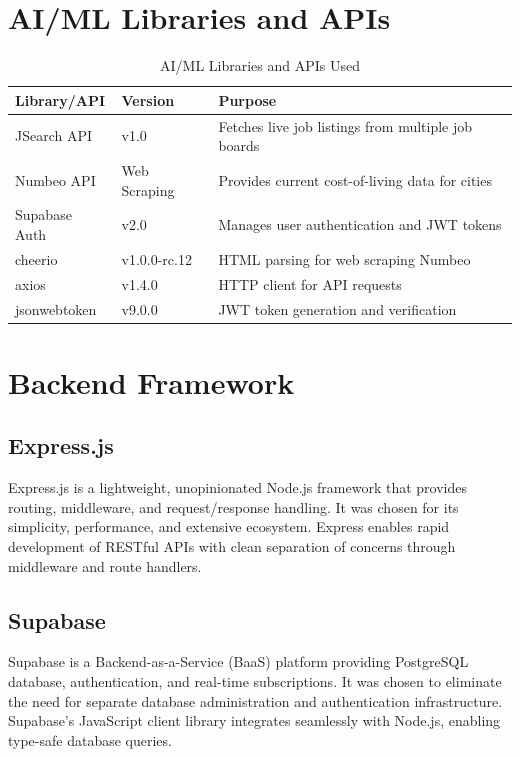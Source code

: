 \documentclass[12pt,a4paper,oneside]{report}
\begin{document}
\section{AI/ML Libraries and APIs}

\begin{table}[H]
\centering
\caption{AI/ML Libraries and APIs Used}
\label{tab:libraries}
\begin{tabular}{|l|l|p{5cm}|}
\hline
\textbf{Library/API} & \textbf{Version} & \textbf{Purpose} \\
\hline
JSearch API & v1.0 & Fetches live job listings from multiple job boards \\
\hline
Numbeo API & Web Scraping & Provides current cost-of-living data for cities \\
\hline
Supabase Auth & v2.0 & Manages user authentication and JWT tokens \\
\hline
cheerio & v1.0.0-rc.12 & HTML parsing for web scraping Numbeo \\
\hline
axios & v1.4.0 & HTTP client for API requests \\
\hline
jsonwebtoken & v9.0.0 & JWT token generation and verification \\
\hline
\end{tabular}
\end{table}

\section{Backend Framework}

\subsection{Express.js}

Express.js is a lightweight, unopinionated Node.js framework that provides routing, middleware, and request/response handling. It was chosen for its simplicity, performance, and extensive ecosystem. Express enables rapid development of RESTful APIs with clean separation of concerns through middleware and route handlers.

\subsection{Supabase}

Supabase is a Backend-as-a-Service (BaaS) platform providing PostgreSQL database, authentication, and real-time subscriptions. It was chosen to eliminate the need for separate database administration and authentication infrastructure. Supabase's JavaScript client library integrates seamlessly with Node.js, enabling type-safe database queries.
\end{document}
